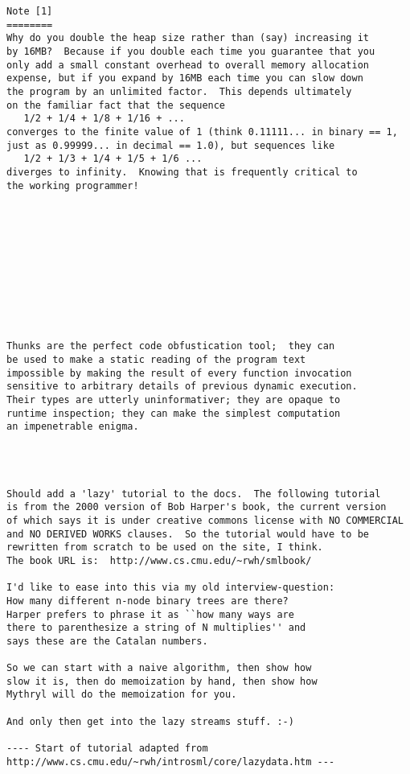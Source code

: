 \begin{verbatim}
Note [1] 
======== 
Why do you double the heap size rather than (say) increasing it 
by 16MB?  Because if you double each time you guarantee that you 
only add a small constant overhead to overall memory allocation 
expense, but if you expand by 16MB each time you can slow down 
the program by an unlimited factor.  This depends ultimately 
on the familiar fact that the sequence 
   1/2 + 1/4 + 1/8 + 1/16 + ... 
converges to the finite value of 1 (think 0.11111... in binary == 1, 
just as 0.99999... in decimal == 1.0), but sequences like 
   1/2 + 1/3 + 1/4 + 1/5 + 1/6 ... 
diverges to infinity.  Knowing that is frequently critical to 
the working programmer! 











Thunks are the perfect code obfustication tool;  they can 
be used to make a static reading of the program text 
impossible by making the result of every function invocation 
sensitive to arbitrary details of previous dynamic execution. 
Their types are utterly uninformativer; they are opaque to 
runtime inspection; they can make the simplest computation 
an impenetrable enigma. 




Should add a 'lazy' tutorial to the docs.  The following tutorial 
is from the 2000 version of Bob Harper's book, the current version 
of which says it is under creative commons license with NO COMMERCIAL 
and NO DERIVED WORKS clauses.  So the tutorial would have to be 
rewritten from scratch to be used on the site, I think. 
The book URL is:  http://www.cs.cmu.edu/~rwh/smlbook/ 

I'd like to ease into this via my old interview-question: 
How many different n-node binary trees are there? 
Harper prefers to phrase it as ``how many ways are 
there to parenthesize a string of N multiplies'' and 
says these are the Catalan numbers. 

So we can start with a naive algorithm, then show how 
slow it is, then do memoization by hand, then show how 
Mythryl will do the memoization for you. 

And only then get into the lazy streams stuff. :-) 

---- Start of tutorial adapted from http://www.cs.cmu.edu/~rwh/introsml/core/lazydata.htm ---




\end{verbatim}
